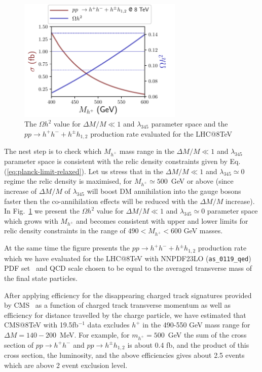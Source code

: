 \documentclass[12pt,a4paper]{article}
\begin{document}
{\begin{figure}[htb]
\begin{center}
  \includegraphics[width=0.7\textwidth]{sigma_h+.pdf}%
  \caption{The $\Omega h^2$ value for $\Delta M/M\ll 1$ and $\lambda_{345}$ parameter space and the $pp\to h^+h^- + h^\pm h_{1,2}$ 
production rate  evaluated for the LHC@8TeV}
  \label{fig:sigmah+}
\end{center}
\end{figure}
The nest step is to check which $M_{h^+}$ mass range 
in the $\Delta M/M\ll 1$ and $\lambda_{345}$ parameter space 
is consistent with the relic density constraints
given by Eq.(\ref{eq:planck-limit-relaxed}).
Let us stress that in the  $\Delta M/M\ll 1$ and $\lambda_{345}\simeq 0$ regime 
the relic density is maximised, for $M_{h^+}\simeq 500$~GeV or above
(since increase of $\Delta M/M$ of $\lambda_{345}$ will boost 
DM annihilation into the gauge bosons faster then the 
co-annihilation effects will be reduced with the $\Delta M/M$ increase).
In Fig.~\ref{fig:sigmah+} we present 
the $\Omega h^2$ value for $\Delta M/M\ll 1$ and $\lambda_{345}\simeq 0$ parameter space
which grows with $M_{h^+}$ and becomes consistent with upper and lower limits for relic density constraints in the range of $490< M_{h^+} <600$ GeV  
masses.

At the same time the figure presents the $pp\to h^+h^- + h^\pm h_{1,2}$ 
production rate which we have evaluated for the LHC@8TeV
with NNPDF23LO (\verb|as_0119_qed|) 
PDF set~\cite{Ball:2012cx}
and QCD scale chosen to be equal to the averaged transverse mass of the
final state particles.



After applying efficiency for the  disappearing charged track signatures provided by  CMS~\cite{CMS:2014gxa}
as a function of charged track transverse momentum as well as efficiency for distance travelled by the charge particle,
we have estimated  that CMS@8TeV with 19.5fb$^{-1}$ data excludes  $h^+$  in the 490-550 GeV mass range for   $\Delta M=140-200$~MeV.
For example, for $m_{h^+}=500$~GeV the sum of the cross section of $pp\to{h^+}{h^-}$ and  $pp\to{h^\pm}{h_{1,2}}$
is about 0.4 fb, and the product of this cross section, the luminosity, and the above efficiencies gives about 2.5 events
which are above 2 event exclusion level.


}
\end{document}
